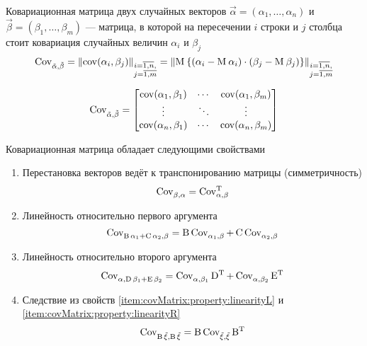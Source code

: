 \begin{definition}\label{def:covMatrix}
  Ковариационная матрица двух случайных векторов
  $\vec{\alpha} = \left( \alpha_1, \dots, \alpha_n \right)$ и
  $\vec{\beta} = \left( \beta_1, \dots, \beta_m \right)$ --- матрица,
  в которой на пересечении $i$ строки и $j$ столбца стоит ковариация случайных
  величин $\alpha_i$ и $\beta_j$
  $$\operatorname{Cov^{}_{\vec{\alpha}, \vec{\beta}}}
      = \left\| \operatorname{cov}\!\left( \alpha_i, \beta_j \right) \right\|_{
      \substack{i= \overline{1,n},\\j= \overline{1,m}}}
      = \left\| \operatorname{M}_{} 
      \left\{ \left( \alpha_i - \operatorname{M}_{} \alpha_i \right)
          \cdot \left( \beta_j - \operatorname{M}_{} \beta_j \right)
      \right\} \right\|_{
          \substack{i= \overline{1,n},\\j= \overline{1,m}}}$$

  $$\operatorname{Cov^{}_{\vec{\alpha}, \vec{\beta}}} =
  \begin{bmatrix}
      \operatorname{cov}\!\left( \alpha_1, \beta_1 \right) & \cdots & \operatorname{cov}\!\left( \alpha_1, \beta_m \right) \\
      \vdots & \ddots & \vdots \\
      \operatorname{cov}\!\left( \alpha_n, \beta_1 \right) & \cdots & \operatorname{cov}\!\left( \alpha_n, \beta_m \right)
  \end{bmatrix}$$
\end{definition}

Ковариационная матрица обладает следующими свойствами
\begin{enumerate}
  \item\label{item:covMatrix:property:transposition}
      Перестановка векторов ведёт к транспонированию матрицы (симметричность)
      $$\operatorname{Cov^{}_{\beta, \alpha}} = \operatorname{Cov^{T}_{\alpha, \beta}}$$
  \item\label{item:covMatrix:property:linearityL}
      Линейность относительно первого аргумента
      $$\operatorname{Cov^{}_{\operatorname{B} \alpha_1 + \operatorname{C} \alpha_2, \beta}}
      = \operatorname{B} \operatorname{Cov^{}_{\alpha_1, \beta}}
          + \operatorname{C}\operatorname{Cov^{}_{\alpha_2, \beta}}$$
  \item\label{item:covMatrix:property:linearityR}
      Линейность относительно второго аргумента
      $$\operatorname{Cov^{}_{\alpha, \operatorname{D} \beta_1 + \operatorname{E} \beta_2}}
      = \operatorname{Cov^{}_{\alpha, \beta_1}} \operatorname{D^T}
          + \operatorname{Cov^{}_{\alpha, \beta_2}} \operatorname{E^T}$$
  \item\label{item:covMatrix:property:operatorOut}
      Следствие из свойств \ref{item:covMatrix:property:linearityL} и
      \ref{item:covMatrix:property:linearityR}
      $$\operatorname{Cov^{}_{\operatorname{B} \vec{\xi}, \operatorname{B} \vec{\xi}}}
      = \operatorname{B} \operatorname{Cov^{}_{\vec{\xi}, \vec{\xi}}} \operatorname{B^T}$$
\end{enumerate}




